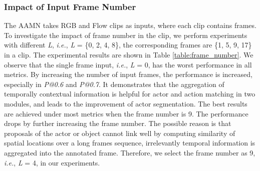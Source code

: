 \documentclass[journal]{IEEEtran}
\begin{document}
\begin{table}[!tb]
\begin{threeparttable}
\caption{Comparison of two temporal aggregation strategies}
\label{table:temporal_aggregation}
\centering
{}
\end{threeparttable}
\vspace{-0.1cm}
\end{table}

\subsubsection{Impact of Input Frame Number}

The AAMN takes RGB and Flow clips as inputs, where each clip contains  frames. To investigate the impact of frame number in the clip, we perform experiments with different \emph{L}, \emph{i.e.}, \emph{L} = \{0, 2, 4, 8\}, the corresponding frames are \{1, 5, 9, 17\} in a clip. The experimental results are shown in Table \ref{table:frame_number}. We observe that the single frame input, \emph{i.e.}, \emph{L} = 0, has the worst performance in all metrics. By increasing the number of input frames, the performance is increased, especially in \emph{P@0.6} and \emph{P@0.7}. It demonstrates that the aggregation of temporally contextual information is helpful for actor and action matching in two modules, and leads to the improvement of actor segmentation. The best results are achieved under most metrics when the frame number is 9. The performance drops by further increasing the frame number. The possible reason is that proposals of the actor or object cannot link well by computing similarity of spatial locations over a long frames sequence, irrelevantly temporal information is aggregated into the annotated frame. Therefore, we select the frame number as 9, \emph{i.e.}, \emph{L} = 4, in our experiments.
\end{document}
